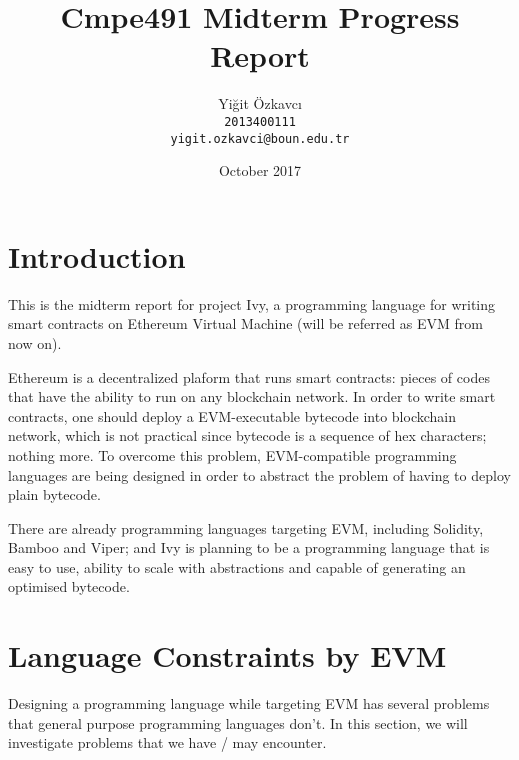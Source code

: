 \documentclass{article}
\title{Cmpe491 Midterm Progress Report}
\author{
  Yiğit Özkavcı \\
  \texttt{2013400111} \\
  \texttt{yigit.ozkavci@boun.edu.tr}
}
\date{October 2017}
\begin{document}

\maketitle

\tableofcontents

\newpage

\section{Introduction}
\par 
\par This is the midterm report for project Ivy, a programming language for writing smart contracts on Ethereum Virtual Machine (will be referred as EVM from now on).
\par Ethereum is a decentralized plaform that runs smart contracts: pieces of codes that have the ability to run on any blockchain network. In order to write smart contracts, one should deploy a EVM-executable bytecode into blockchain network, which is not practical since bytecode is a sequence of hex characters; nothing more. To overcome this problem, EVM-compatible programming languages are being designed in order to abstract the problem of having to deploy plain bytecode. 
\par There are already programming languages targeting EVM, including Solidity\cite{solidity}, Bamboo\cite{bamboo} and Viper\cite{viper}; and Ivy is planning to be a programming language that is easy to use, ability to scale with abstractions and capable of generating an optimised bytecode.

\section{Language Constraints by EVM}
Designing a programming language while targeting EVM has several problems that general purpose programming languages don't. In this section, we will investigate problems that we have / may encounter.
\end{document}
